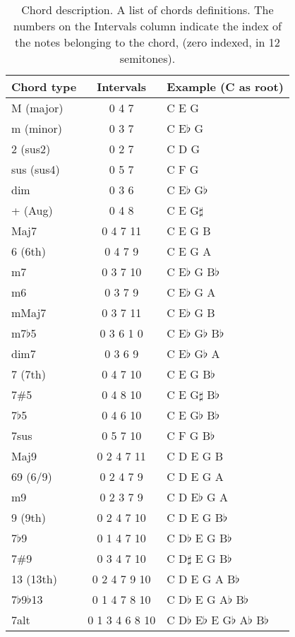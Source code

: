 \begin{table}
\centering
  \caption[Chord description.] {Chord description. A list of chords definitions.  The numbers on the Intervals column indicate the index of the notes belonging to the chord, (zero indexed, in 12 semitones).}
  \label{tab:chord_extensions}
  \begin{tabular}{  l  c  l }
    \hline
    Chord type & Intervals & Example (C as root) \\ \hline
    M (major) & 0 4 7 & C E G \\
    m (minor) & 0 3 7 & C E$\flat$ G \\
    2 (sus2) & 0 2 7 & C D G \\
	sus (sus4) & 0 5 7 & C F G \\
    dim & 0 3 6 &  C E$\flat$ G$\flat$\\
    + (Aug) & 0 4 8 & C E G$\sharp$ \\
	Maj7 & 0 4 7 11 & C E G B \\
	6 (6th) & 0 4 7 9 & C E G A \\
	m7 & 0 3 7 10 & C E$\flat$ G B$\flat$ \\
	m6 & 0 3 7 9 & C E$\flat$ G A \\
	mMaj7 & 0 3 7 11 & C E$\flat$ G B \\
    m7$\flat$5 & 0 3 6 1 0& C E$\flat$ G$\flat$ B$\flat$ \\
    dim7 & 0 3 6 9 & C E$\flat$ G$\flat$ A \\
	7 (7th) & 0 4 7 10 & C E G B$\flat$ \\
	7\#5 & 0 4 8 10 & C E G$\sharp$ B$\flat$ \\
	7$\flat$5 & 0 4 6 10 & C E G$\flat$ B$\flat$ \\
	7sus & 0 5 7 10 & C F G B$\flat$ \\
	Maj9 & 0 2 4 7 11 & C D E G B \\
	69 (6/9) & 0 2 4 7 9 & C D E G A \\
	m9 & 0 2 3 7 9 & C D E$\flat$ G A \\
	9 (9th) & 0 2 4 7 10 & C D E G B$\flat$ \\
	7$\flat$9 & 0 1 4 7 10 & C D$\flat$ E G B$\flat$ \\
	7\#9 & 0 3 4 7 10 & C D$\sharp$ E G B$\flat$ \\
	13 (13th) & 0 2 4 7 9 10 & C D E G A B$\flat$ \\
	7$\flat$9$\flat$13 & 0 1 4 7 8 10 & C D$\flat$ E G A$\flat$ B$\flat$ \\
	7alt & 0 1 3 4 6 8 10 & C D$\flat$ E$\flat$ E G$\flat$ A$\flat$ B$\flat$ \\
    \hline
  \end{tabular}

\end{table}
